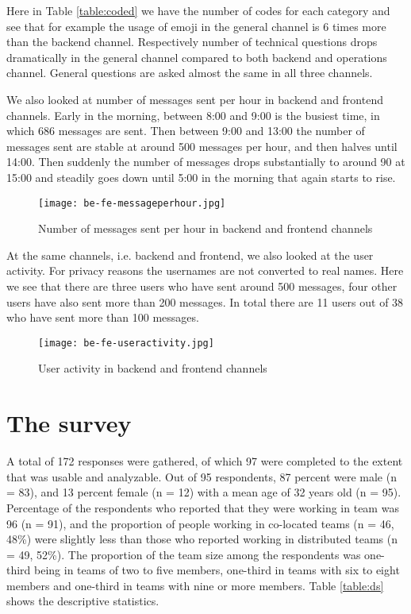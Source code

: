 Here in Table \ref{table:coded} we have the number of codes for each category and see that for example the usage of emoji in the general channel is 6 times more than the backend channel. Respectively number of technical questions drops dramatically in the general channel compared to both backend and operations channel. General questions are asked almost the same in all three channels.

We also looked at number of messages sent per hour in backend and frontend channels. Early in the morning, between 8:00 and 9:00 is the busiest time, in which 686 messages are sent. Then between 9:00 and 13:00 the number of messages sent are stable at around 500 messages per hour, and then halves until 14:00. Then suddenly the number of messages drops substantially to around 90 at 15:00 and steadily goes down until 5:00 in the morning that again starts to rise.

\begin{figure}[hbt!]
\centering
\texttt{[image: be-fe-messageperhour.jpg]}
\caption{Number of messages sent per hour in backend and frontend channels}\label{fig:mph}
\end{figure}

At the same channels, i.e. backend and frontend, we also looked at the user activity. For privacy reasons the usernames are not converted to real names. Here we see that there are three users who have sent around 500 messages, four other users have also sent more than 200 messages. In total there are 11 users out of 38 who have sent more than 100 messages. 

\begin{figure}[hbt!]
\centering
\texttt{[image: be-fe-useractivity.jpg]}
\caption{User activity in backend and frontend channels}\label{fig:useractivity}
\end{figure}



\clearpage
\section{The survey}

A total of 172 responses were gathered, of which 97 were completed to the extent that was usable and analyzable. Out of 95 respondents, 87 percent were male (n = 83), and 13 percent female (n = 12) with a mean age of 32 years old (n = 95). Percentage of the respondents who reported that they were working in team was 96 (n = 91), and the proportion of people working in co-located teams (n = 46, 48\%) were slightly less than those who reported working in distributed teams (n = 49, 52\%). The proportion of the team size among the respondents was one-third being in teams of two to five members, one-third in teams with six to eight members and one-third in teams with nine or more members. Table \ref{table:ds} shows the descriptive statistics. 


